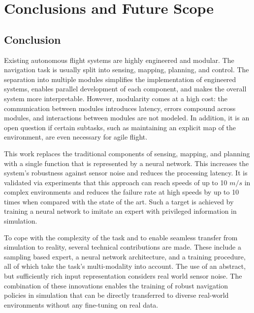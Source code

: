 \chapter{Conclusions and Future Scope}

\section{Conclusion}
Existing autonomous flight systems are highly engineered and modular.
The navigation task is usually split into sensing, mapping, planning,
and control. The separation into multiple modules simplifies the implementation of engineered systems, enables parallel development of each
component, and makes the overall system more interpretable. However,
modularity comes at a high cost: the communication between modules
introduces latency, errors compound across modules, and interactions
between modules are not modeled. In addition, it is an open question if certain subtasks, such as maintaining an explicit map of the
environment, are even necessary for agile flight.

This work replaces the traditional components of sensing, mapping,
and planning with a single function that is represented by a neural
network. This increases the system’s robustness against sensor noise
and reduces the processing latency. It is validated via experiments that this approach
can reach speeds of up to 10 $m/s$ in complex environments and
reduces the failure rate at high speeds by up to 10 times when compared
with the state of the art.
Such a target is achieved by training a neural network to imitate an expert
with privileged information in simulation. 

To cope with the complexity
of the task and to enable seamless transfer from simulation to reality,
several technical contributions are made. These include a sampling based expert, a neural network architecture, and a training procedure,
all of which take the task’s multi-modality into account. The use of an abstract, but sufficiently rich input representation considers real world sensor noise. The combination of these innovations enables the
training of robust navigation policies in simulation that can be directly
transferred to diverse real-world environments without any fine-tuning
on real data.

